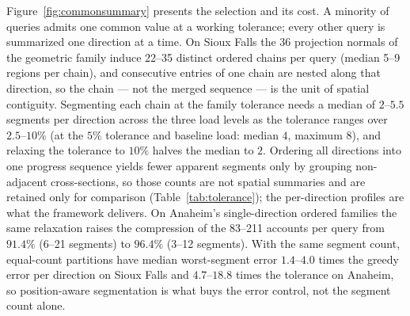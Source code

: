Figure~\ref{fig:commonsummary} presents the selection and its cost. A
minority of queries admits one common value at a working tolerance;
every other query is summarized one direction at a time. On Sioux
Falls the 36 projection normals of the geometric family induce
22--35 distinct ordered chains per query (median 5--9 regions per
chain), and consecutive entries of one chain are nested along that
direction, so the chain --- not the merged sequence --- is the unit of
spatial contiguity. Segmenting each chain at the family tolerance
needs a median of $2$--$5.5$ segments per direction across the three
load levels as the tolerance ranges over $2.5$--$10\%$ (at the $5\%$
tolerance and baseline load: median $4$, maximum $8$), and relaxing
the tolerance to $10\%$ halves the median to $2$. Ordering all
directions into one progress sequence yields fewer apparent segments
only by grouping non-adjacent cross-sections, so those counts are not
spatial summaries and are retained only for comparison
(Table~\ref{tab:tolerance}); the per-direction profiles are what the
framework delivers. On Anaheim's single-direction ordered families
the same relaxation raises the compression of the 83--211 accounts
per query from $91.4\%$ (6--21 segments) to $96.4\%$ (3--12
segments). With the same segment count, equal-count partitions have
median worst-segment error $1.4$--$4.0$ times the greedy error per
direction on Sioux Falls and $4.7$--$18.8$ times the tolerance on
Anaheim, so position-aware segmentation is what buys the error
control, not the segment count alone.


